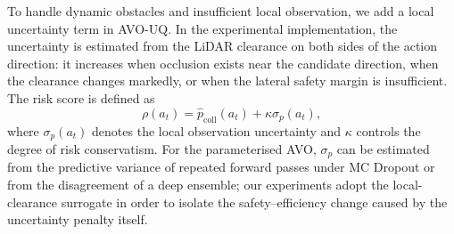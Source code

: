 \documentclass[10pt,a4paper,twocolumn]{article}
\begin{document}
To handle dynamic obstacles and insufficient local observation, we add a local uncertainty term in AVO-UQ. In the experimental implementation, the uncertainty is estimated from the LiDAR clearance on both sides of the action direction: it increases when occlusion exists near the candidate direction, when the clearance changes markedly, or when the lateral safety margin is insufficient. The risk score is defined as
\begin{equation}
    \rho(a_t) = \hat{p}_{\mathrm{coll}}(a_t) + \kappa \sigma_p(a_t),
\end{equation}
where $\sigma_p(a_t)$ denotes the local observation uncertainty and $\kappa$ controls the degree of risk conservatism. For the parameterised AVO, $\sigma_p$ can be estimated from the predictive variance of repeated forward passes under MC Dropout or from the disagreement of a deep ensemble; our experiments adopt the local-clearance surrogate in order to isolate the safety--efficiency change caused by the uncertainty penalty itself.

\begin{table}[H]
    \centering

    \caption{Key AVO safety-filter parameters}
    \label{tab:pvo_params}
    \scriptsize

\end{table}
\end{document}
